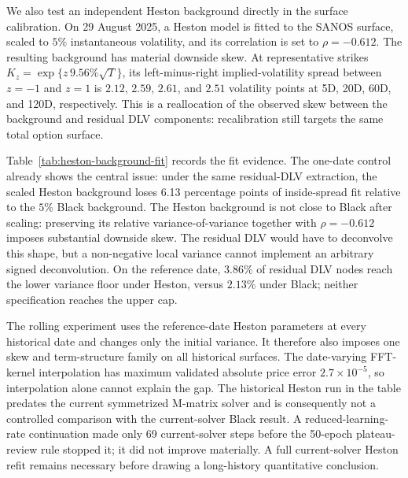\documentclass[11pt]{article}
\theoremstyle{plain}
\theoremstyle{definition}
\theoremstyle{remark}
\begin{document}
We also test an independent Heston background directly in the surface
calibration.  On 29 August 2025, a Heston model is fitted to the SANOS surface,
scaled to $5\%$ instantaneous volatility, and its correlation is set to
$\rho=-0.612$.  The resulting background has material downside skew.  At
representative strikes
$K_z=\exp\{z\,9.56\%\sqrt{T}\}$, its left-minus-right implied-volatility
spread between $z=-1$ and $z=1$ is $2.12$, $2.59$, $2.61$, and $2.51$
volatility points at 5D, 20D, 60D, and 120D, respectively.  This is a
reallocation of the observed skew between the background and residual DLV
components: recalibration still targets the same total option surface.

Table~\ref{tab:heston-background-fit} records the fit evidence.  The one-date
control already shows the central issue: under the same residual-DLV
extraction, the scaled Heston background loses 6.13 percentage points of
inside-spread fit relative to the $5\%$ Black background.  The Heston
background is not close to Black after scaling: preserving its relative
variance-of-variance together with $\rho=-0.612$ imposes substantial downside
skew.  The residual DLV would have to deconvolve this shape, but a
non-negative local variance cannot implement an arbitrary signed
deconvolution.  On the reference date, $3.86\%$ of residual DLV nodes reach
the lower variance floor under Heston, versus $2.13\%$ under Black; neither
specification reaches the upper cap.

The rolling experiment uses the reference-date Heston parameters at every
historical date and changes only the initial variance.  It therefore also
imposes one skew and term-structure family on all historical surfaces.  The
date-varying FFT-kernel interpolation has maximum validated absolute price
error $2.7\times10^{-5}$, so interpolation alone cannot explain the gap.
The historical Heston run in the table predates the current symmetrized
M-matrix solver and is consequently not a controlled comparison with the
current-solver Black result.  A reduced-learning-rate continuation made only
69 current-solver steps before the 50-epoch plateau-review rule stopped it;
it did not improve materially.  A full current-solver Heston refit remains
necessary before drawing a long-history quantitative conclusion.
\end{document}
